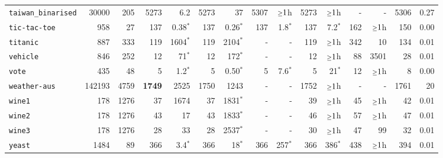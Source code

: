 \begin{tabular}{lccrrrrrrrrrrrr}
\texttt{taiwan\_binarised} & \multicolumn{1}{r}{30000} & \multicolumn{1}{r}{205}  & 5273 & 6.2 & 5273 & 37 & 5307 & $\mathsmaller{\geq}1$h & 5273 & $\mathsmaller{\geq}1$h & - & - & 5306 & 0.27\\
\texttt{tic-tac-toe} & \multicolumn{1}{r}{958} & \multicolumn{1}{r}{27}  & 137 & 0.38$^*$ & 137 & 0.26$^*$ & 137 & 1.8$^*$ & 137 & 7.2$^*$ & 162 & $\mathsmaller{\geq}1$h & 150 & 0.00\\
\texttt{titanic} & \multicolumn{1}{r}{887} & \multicolumn{1}{r}{333}  & 119 & 1604$^*$ & 119 & 2104$^*$ & - & - & 119 & $\mathsmaller{\geq}1$h & 342 & 10 & 134 & 0.01\\
\texttt{vehicle} & \multicolumn{1}{r}{846} & \multicolumn{1}{r}{252}  & 12 & 71$^*$ & 12 & 172$^*$ & - & - & 12 & $\mathsmaller{\geq}1$h & 88 & 3501 & 28 & 0.01\\
\texttt{vote} & \multicolumn{1}{r}{435} & \multicolumn{1}{r}{48}  & 5 & 1.2$^*$ & 5 & 0.50$^*$ & 5 & 7.6$^*$ & 5 & 21$^*$ & 12 & $\mathsmaller{\geq}1$h & 8 & 0.00\\
\texttt{weather-aus} & \multicolumn{1}{r}{142193} & \multicolumn{1}{r}{4759}  & \textbf{1749} & 2525 & 1750 & 1243 & - & - & 1752 & $\mathsmaller{\geq}1$h & - & - & 1761 & 20\\
\texttt{wine1} & \multicolumn{1}{r}{178} & \multicolumn{1}{r}{1276}  & 37 & 1674 & 37 & 1831$^*$ & - & - & 39 & $\mathsmaller{\geq}1$h & 45 & $\mathsmaller{\geq}1$h & 42 & 0.01\\
\texttt{wine2} & \multicolumn{1}{r}{178} & \multicolumn{1}{r}{1276}  & 43 & 17 & 43 & 1833$^*$ & - & - & 46 & $\mathsmaller{\geq}1$h & 57 & $\mathsmaller{\geq}1$h & 47 & 0.01\\
\texttt{wine3} & \multicolumn{1}{r}{178} & \multicolumn{1}{r}{1276}  & 28 & 33 & 28 & 2537$^*$ & - & - & 30 & $\mathsmaller{\geq}1$h & 47 & 99 & 32 & 0.01\\
\texttt{yeast} & \multicolumn{1}{r}{1484} & \multicolumn{1}{r}{89}  & 366 & 3.4$^*$ & 366 & 18$^*$ & 366 & 257$^*$ & 366 & 386$^*$ & 438 & $\mathsmaller{\geq}1$h & 394 & 0.01\\
\bottomrule
\end{tabular}
